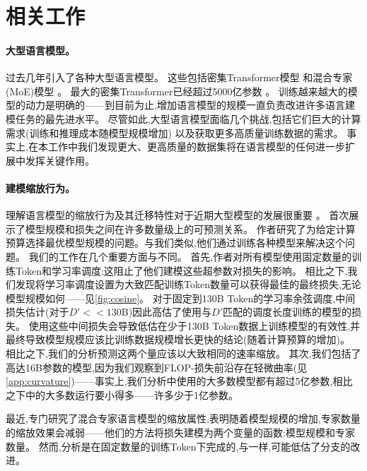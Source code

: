 \documentclass[11pt, a4paper, logo, copyright, nonumbering]{deepmind}
\begin{document}
\section{相关工作}
\label{sec:related_work}
\paragraph{大型语言模型。}
过去几年引入了各种大型语言模型。
这些包括密集Transformer模型 \citep{gpt3, jurassic, nlg530b, rae2021gopher, thoppilan2022lamda}和混合专家(MoE)模型 \citep{du2021glam, fedus2021switch, zoph2022designing}。
最大的密集Transformer已经超过5000亿参数 \citep{nlg530b}。
训练越来越大的模型的动力是明确的——到目前为止,增加语言模型的规模一直负责改进许多语言建模任务的最先进水平。
尽管如此,大型语言模型面临几个挑战,包括它们巨大的计算需求(训练和推理成本随模型规模增加) \citep{rae2021gopher, thoppilan2022lamda}以及获取更多高质量训练数据的需求。
事实上,在本工作中我们发现更大、更高质量的数据集将在语言模型的任何进一步扩展中发挥关键作用。

\paragraph{建模缩放行为。}
理解语言模型的缩放行为及其迁移特性对于近期大型模型的发展很重要 \citep{kaplan2020scaling,  hernandez2021scaling}。
\citet{kaplan2020scaling}首次展示了模型规模和损失之间在许多数量级上的可预测关系。
作者研究了为给定计算预算选择最优模型规模的问题。与我们类似,他们通过训练各种模型来解决这个问题。
我们的工作在几个重要方面与\citet{kaplan2020scaling}不同。
首先,作者对所有模型使用固定数量的训练Token和学习率调度;这阻止了他们建模这些超参数对损失的影响。
相比之下,我们发现将学习率调度设置为大致匹配训练Token数量可以获得最佳的最终损失,无论模型规模如何——见\autoref{fig:cosine}。
对于固定到130B Token的学习率余弦调度,中间损失估计(对于$D' << 130$B)因此高估了使用与$D'$匹配的调度长度训练的模型的损失。
使用这些中间损失会导致低估在少于130B Token数据上训练模型的有效性,并最终导致模型规模应该比训练数据规模增长更快的结论(随着计算预算的增加)。
相比之下,我们的分析预测这两个量应该以大致相同的速率缩放。
其次,我们包括了高达16B参数的模型,因为我们观察到FLOP-损失前沿存在轻微曲率(见\autoref{app:curvature})——事实上,我们分析中使用的大多数模型都有超过5亿参数,相比之下\citet{kaplan2020scaling}中的大多数运行要小得多——许多少于1亿参数。

最近,\citet{clark2022unified}专门研究了混合专家语言模型的缩放属性,表明随着模型规模的增加,专家数量的缩放效果会减弱——他们的方法将损失建模为两个变量的函数:模型规模和专家数量。
然而,分析是在固定数量的训练Token下完成的,与\citet{kaplan2020scaling}一样,可能低估了分支的改进。
\end{document}
